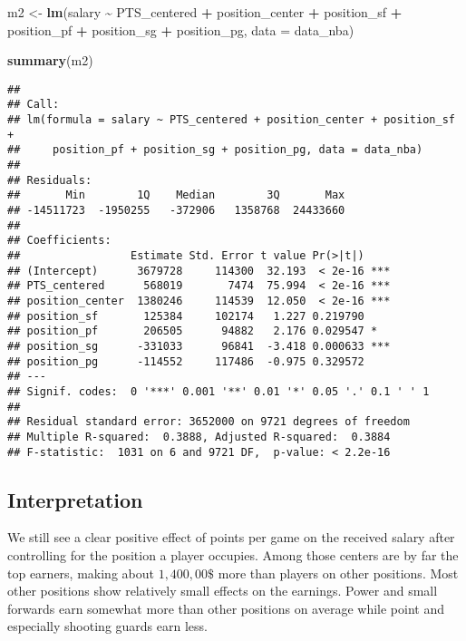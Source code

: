 \documentclass[
]{book}
\newenvironment{Shaded}{\begin{snugshade}}{\end{snugshade}}
\newcommand{\AttributeTok}[1]{\textcolor[rgb]{0.13,0.29,0.53}{#1}}
\newcommand{\FunctionTok}[1]{\textcolor[rgb]{0.13,0.29,0.53}{\textbf{#1}}}
\newcommand{\NormalTok}[1]{#1}
\newcommand{\OtherTok}[1]{\textcolor[rgb]{0.56,0.35,0.01}{#1}}
\newcommand{\SpecialCharTok}[1]{\textcolor[rgb]{0.81,0.36,0.00}{\textbf{#1}}}
\begin{document}
\begin{Shaded}
\begin{Highlighting}[]
\NormalTok{m2 }\OtherTok{\textless{}{-}} \FunctionTok{lm}\NormalTok{(salary }\SpecialCharTok{\textasciitilde{}}\NormalTok{ PTS\_centered }\SpecialCharTok{+}\NormalTok{ position\_center }\SpecialCharTok{+}\NormalTok{ position\_sf }\SpecialCharTok{+}\NormalTok{  position\_pf }\SpecialCharTok{+}\NormalTok{ position\_sg }\SpecialCharTok{+}\NormalTok{ position\_pg, }\AttributeTok{data =}\NormalTok{ data\_nba)}

\FunctionTok{summary}\NormalTok{(m2)}
\end{Highlighting}
\end{Shaded}

\begin{verbatim}
## 
## Call:
## lm(formula = salary ~ PTS_centered + position_center + position_sf + 
##     position_pf + position_sg + position_pg, data = data_nba)
## 
## Residuals:
##       Min        1Q    Median        3Q       Max 
## -14511723  -1950255   -372906   1358768  24433660 
## 
## Coefficients:
##                 Estimate Std. Error t value Pr(>|t|)    
## (Intercept)      3679728     114300  32.193  < 2e-16 ***
## PTS_centered      568019       7474  75.994  < 2e-16 ***
## position_center  1380246     114539  12.050  < 2e-16 ***
## position_sf       125384     102174   1.227 0.219790    
## position_pf       206505      94882   2.176 0.029547 *  
## position_sg      -331033      96841  -3.418 0.000633 ***
## position_pg      -114552     117486  -0.975 0.329572    
## ---
## Signif. codes:  0 '***' 0.001 '**' 0.01 '*' 0.05 '.' 0.1 ' ' 1
## 
## Residual standard error: 3652000 on 9721 degrees of freedom
## Multiple R-squared:  0.3888, Adjusted R-squared:  0.3884 
## F-statistic:  1031 on 6 and 9721 DF,  p-value: < 2.2e-16
\end{verbatim}

\hypertarget{interpretation-1}{%
\subsection{Interpretation}\label{interpretation-1}}

We still see a clear positive effect of points per game on the received salary
after controlling for the position a player occupies. Among those centers are by
far the top earners, making about \(1,400,00\$\) more than players on other
positions. Most other positions show relatively small effects on the earnings.
Power and small forwards earn somewhat more than other positions on average
while point and especially shooting guards earn less.
\end{document}
